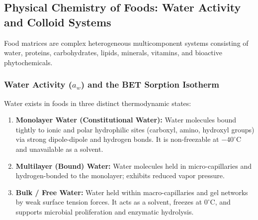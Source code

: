 \documentclass[11pt,a4paper,oneside]{article}
\begin{document}
\subsection{Physical Chemistry of Foods: Water Activity and Colloid Systems}

Food matrices are complex heterogeneous multicomponent systems consisting of water, proteins, carbohydrates, lipids, minerals, vitamins, and bioactive phytochemicals.

\subsubsection{Water Activity (\texorpdfstring{$a_w$}{aw}) and the BET Sorption Isotherm}
Water exists in foods in three distinct thermodynamic states:
\begin{enumerate}[leftmargin=*]
    \item \textbf{Monolayer Water (Constitutional Water):} Water molecules bound tightly to ionic and polar hydrophilic sites (carboxyl, amino, hydroxyl groups) via strong dipole-dipole and hydrogen bonds. It is non-freezable at $-40^\circ\text{C}$ and unavailable as a solvent.
    \item \textbf{Multilayer (Bound) Water:} Water molecules held in micro-capillaries and hydrogen-bonded to the monolayer; exhibits reduced vapor pressure.
    \item \textbf{Bulk / Free Water:} Water held within macro-capillaries and gel networks by weak surface tension forces. It acts as a solvent, freezes at $0^\circ\text{C}$, and supports microbial proliferation and enzymatic hydrolysis.
\end{enumerate}
\end{document}
